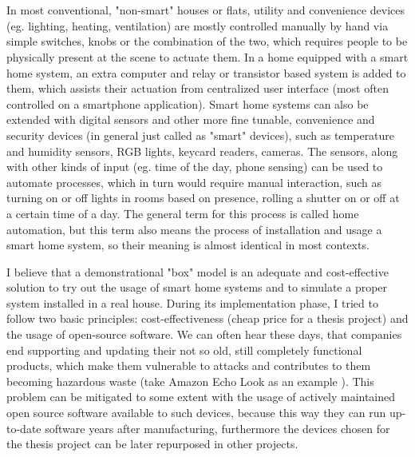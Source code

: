 \chapter{\bevezetes}



In most conventional, "non-smart" houses or flats, utility and convenience devices (eg. lighting, heating, ventilation) are mostly controlled manually by hand via simple switches, knobs or the combination of the two, which requires people to be physically present at the scene to actuate them. In a home equipped with a smart home system, an extra computer and relay or transistor based system is added to them, which assists their actuation from centralized user interface (most often controlled on a smartphone application). Smart home systems can also be extended with digital sensors and other more fine tunable, convenience and security devices (in general just called as "smart" devices), such as temperature and humidity sensors, RGB lights, keycard readers, cameras. The sensors, along with other kinds of input (eg. time of the day, phone sensing) can be used to automate processes, which in turn would require manual interaction, such as turning on or off lights in rooms based on presence, rolling a shutter on or off at a certain time of a day. The general term for this process is called home automation, but this term also means the process of installation and usage a smart home system, so their meaning is almost identical in most contexts. \break

I believe that a demonstrational "box" model is an adequate and cost-effective solution to try out the usage of smart home systems and to simulate a proper system installed in a real house. During its implementation phase, I tried to follow two basic principles: cost-effectiveness (cheap price for a thesis project) and the usage of open-source software. We can often hear these days, that companies end supporting and updating their not so old, still completely functional products, which make them vulnerable to attacks and contributes to them becoming hazardous waste (take Amazon Echo Look as an example \cite{VergeAmazonEchoLook}). This problem can be mitigated to some extent with the usage of actively maintained open source software available to such devices, because this way they can run up-to-date software years after manufacturing, furthermore the devices chosen for the thesis project can be later repurposed in other projects.\break

